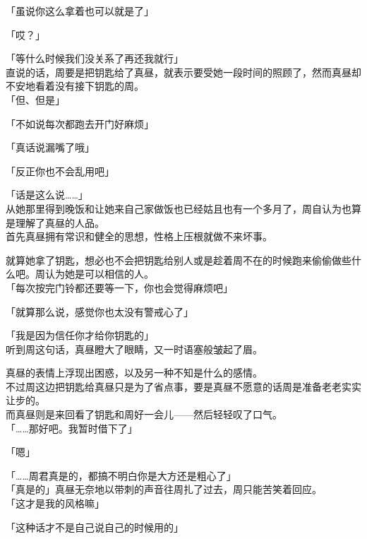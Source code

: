「虽说你这么拿着也可以就是了」

「哎？」

「等什么时候我们没关系了再还我就行」\\

直说的话，周要是把钥匙给了真昼，就表示要受她一段时间的照顾了，然而真昼却不安地看着没有接下钥匙的周。\\

「但、但是」

「不如说每次都跑去开门好麻烦」

「真话说漏嘴了哦」

「反正你也不会乱用吧」

「话是这么说……」\\

从她那里得到晚饭和让她来自己家做饭也已经姑且也有一个多月了，周自认为也算是理解了真昼的人品。\\

首先真昼拥有常识和健全的思想，性格上压根就做不来坏事。

就算她拿了钥匙，想必也不会把钥匙给别人或是趁着周不在的时候跑来偷偷做些什么吧。周认为她是可以相信的人。\\

「每次按完门铃都还要等一下，你也会觉得麻烦吧」

「就算那么说，感觉你也太没有警戒心了」

「我是因为信任你才给你钥匙的」\\

听到周这句话，真昼瞪大了眼睛，又一时语塞般皱起了眉。

真昼的表情上浮现出困惑，以及另一种不知是什么的感情。\\

不过周这边把钥匙给真昼只是为了省点事，要是真昼不愿意的话周是准备老老实实让步的。\\

而真昼则是来回看了钥匙和周好一会儿——然后轻轻叹了口气。\\

「……那好吧。我暂时借下了」

「嗯」

「……周君真是的，都搞不明白你是大方还是粗心了」\\

「真是的」真昼无奈地以带刺的声音往周扎了过去，周只能苦笑着回应。\\

「这才是我的风格嘛」

「这种话才不是自己说自己的时候用的」\\

